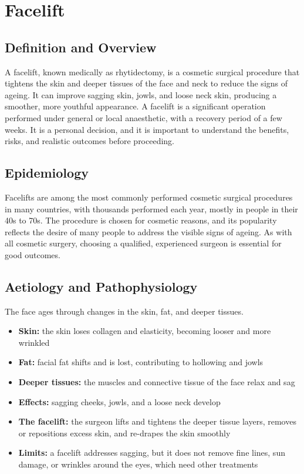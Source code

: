 \chapter{Facelift}

\section*{Definition and Overview}
A facelift, known medically as rhytidectomy, is a cosmetic surgical procedure that tightens the skin and deeper tissues of the face and neck to reduce the signs of ageing. It can improve sagging skin, jowls, and loose neck skin, producing a smoother, more youthful appearance. A facelift is a significant operation performed under general or local anaesthetic, with a recovery period of a few weeks. It is a personal decision, and it is important to understand the benefits, risks, and realistic outcomes before proceeding.

\section*{Epidemiology}
Facelifts are among the most commonly performed cosmetic surgical procedures in many countries, with thousands performed each year, mostly in people in their 40s to 70s. The procedure is chosen for cosmetic reasons, and its popularity reflects the desire of many people to address the visible signs of ageing. As with all cosmetic surgery, choosing a qualified, experienced surgeon is essential for good outcomes.

\section*{Aetiology and Pathophysiology}
The face ages through changes in the skin, fat, and deeper tissues.
\begin{itemize}
    \item \textbf{Skin:} the skin loses collagen and elasticity, becoming looser and more wrinkled
    \item \textbf{Fat:} facial fat shifts and is lost, contributing to hollowing and jowls
    \item \textbf{Deeper tissues:} the muscles and connective tissue of the face relax and sag
    \item \textbf{Effects:} sagging cheeks, jowls, and a loose neck develop
    \item \textbf{The facelift:} the surgeon lifts and tightens the deeper tissue layers, removes or repositions excess skin, and re-drapes the skin smoothly
    \item \textbf{Limits:} a facelift addresses sagging, but it does not remove fine lines, sun damage, or wrinkles around the eyes, which need other treatments
\end{itemize}

